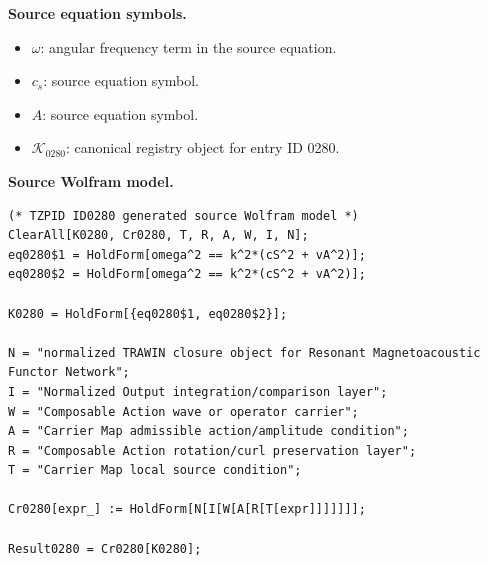 \begin{minipage}[t]{0.49\linewidth}
\begingroup
\small
\raggedright
\textbf{Source equation symbols.}\par
\begin{itemize}[leftmargin=1.35em,itemsep=1pt,topsep=1pt,parsep=0pt]
    \item $\omega$: angular frequency term in the source equation.
    \item $c_s$: source equation symbol.
    \item $A$: source equation symbol.
    \item $\mathcal{K}_{0280}$: canonical registry object for entry ID 0280.
\end{itemize}
\endgroup
\end{minipage}\hfill
\begin{minipage}[t]{0.47\linewidth}
\begingroup
\scriptsize
\raggedright
\textbf{Source Wolfram model.}\par
\begin{Verbatim}[fontsize=\tiny,breaklines=true,breakanywhere=true]
(* TZPID ID0280 generated source Wolfram model *)
ClearAll[K0280, Cr0280, T, R, A, W, I, N];
eq0280$1 = HoldForm[omega^2 == k^2*(cS^2 + vA^2)];
eq0280$2 = HoldForm[omega^2 == k^2*(cS^2 + vA^2)];

K0280 = HoldForm[{eq0280$1, eq0280$2}];

N = "normalized TRAWIN closure object for Resonant Magnetoacoustic Functor Network";
I = "Normalized Output integration/comparison layer";
W = "Composable Action wave or operator carrier";
A = "Carrier Map admissible action/amplitude condition";
R = "Composable Action rotation/curl preservation layer";
T = "Carrier Map local source condition";

Cr0280[expr_] := HoldForm[N[I[W[A[R[T[expr]]]]]]];

Result0280 = Cr0280[K0280];
\end{Verbatim}
\endgroup
\end{minipage}

